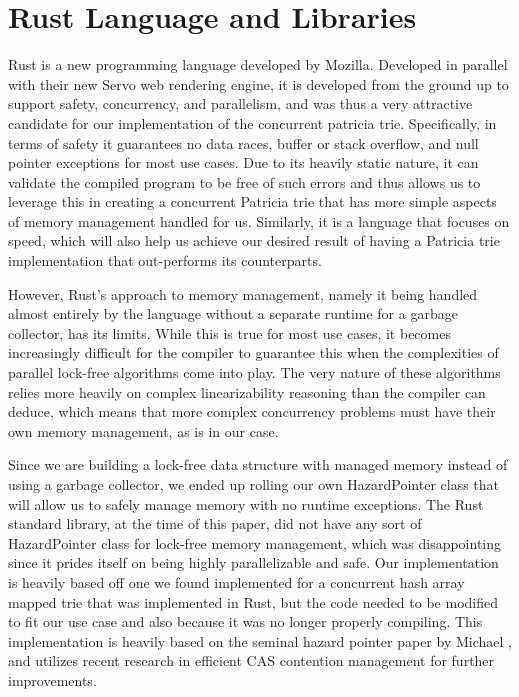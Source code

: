 \documentclass[conference]{IEEEtran}
\begin{document}
\section{Rust Language and Libraries}
Rust is a new programming language developed by Mozilla. Developed in parallel with their new Servo web rendering engine, it is developed from the ground up to support safety, concurrency, and parallelism, and was thus a very attractive candidate for our implementation of the concurrent patricia trie.\cite{MozillaResearch} Specifically, in terms of safety it guarantees no data races, buffer or stack overflow, and null pointer exceptions for most use cases. Due to its heavily static nature, it can validate the compiled program to be free of such errors and thus allows us to leverage this in creating a concurrent Patricia trie that has more simple aspects of memory management handled for us. Similarly, it is a language that focuses on speed, which will also help us achieve our desired result of having a Patricia trie implementation that out-performs its counterparts.
\par
However, Rust's approach to memory management, namely it being handled almost entirely by the language without a separate runtime for a garbage collector, has its limits. While this is true for most use cases, it becomes increasingly difficult for the compiler to guarantee this when the complexities of parallel lock-free algorithms come into play. The very nature of these algorithms relies more heavily on complex linearizability reasoning than the compiler can deduce, which means that more complex concurrency problems must have their own memory management, as is in our case.
\par
Since we are building a lock-free data structure with managed memory instead of using a garbage collector, we ended up rolling our own HazardPointer class that will allow us to safely manage memory with no runtime exceptions. The Rust standard library, at the time of this paper, did not have any sort of HazardPointer class for lock-free memory management, which was disappointing since it prides itself on being highly parallelizable and safe. Our implementation is heavily based off one we found implemented for a concurrent hash array mapped trie that was implemented in Rust\cite{CHAMT}, but the code needed to be modified to fit our use case and also because it was no longer properly compiling. This implementation is heavily based on the seminal hazard pointer paper by Michael \cite{Michael2004}, and utilizes recent research in efficient CAS contention management for further improvements.\cite{Dice2013}
\par
\end{document}
